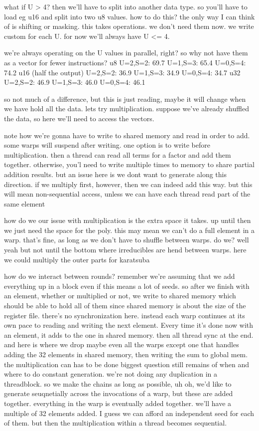 what if U > 4?
then we'll have to split into another data type. so you'll have to load eg u16 and split into two u8 values. how to do this? the only way I can think of is shifting or masking. this takes operations. we don't need them now. we write custom for each U. for now we'll always have U <= 4.

we're always operating on the U values in parallel, right? so why not have them as a vector for fewer instructions?
u8
U=2,S=2: 69.7
U=1,S=3: 65.4
U=0,S=4: 74.2
u16 (half the output)
U=2,S=2: 36.9
U=1,S=3: 34.9
U=0,S=4: 34.7
u32
U=2,S=2: 46.9
U=1,S=3: 46.0
U=0,S=4: 46.1

so not much of a difference, but this is just reading, maybe it will change when we have hold all the data. 
lets try multiplication. suppose we've already shuffled the data, so 
here we'll need to access the vectors. 

note how we're gonna have to write to shared memory and read in order to add. some warps will suspend after writing.
one option is to write before multiplication. then a thread can read all terms for a factor and add them together.
otherwise, you'l need to write multiple times to memory to share partial addition results. but an issue here is we dont want to generate along this direction. 
if we multiply first, however, then we can indeed add this way. but this will mean non-sequential access, unless we can have each thread read part of the same element

how do we 
our issue with multiplication is the extra space it takes. up until then we just need the space for the poly. 
this may mean we can't do a full element in a warp. that's fine, as long as we don't have to shuffle between warps. do we? well yeah but not until the bottom where irreducibles are hend between warps. here we could multiply the outer parts for karatsuba

how do we interact between rounds?
remember we're assuming that we add everything up in a block even if this means a lot of seeds. 
so after we finish with an element, whether or multiplied or not, we write to shared memory which should be able to hold all of them since shared memory is about the size of the register file. there's no synchronization here. instead each warp continues at its own pace to reading and writing the next element.
Every time it's done now with an element, it adds to the one in shared memory. then all thread sync at the end.
and here is where we drop maybe even all the warps except one that handles adding the 32 elements in shared memory, then writing the sum to global mem. 
the multiplication can has to be done 
biggest question still remains of when and where to do constant generation. we're not doing any duplication in a threadblock. so we make the chains as long as possible, 
uh oh, we'd like to generate seuqnetially across the invocations of a warp, but these are added together. everything in the warp is eventually added together. we'll have a multiple of 32 elements added. I guess we can afford an independent seed for each of them. but then the multiplication within a thread becomes sequential.

